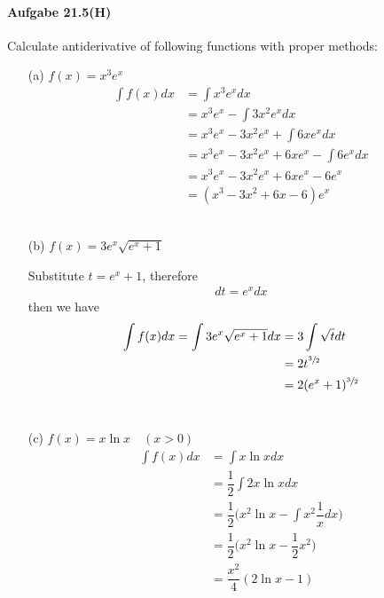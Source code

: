 \documentclass[11pt,a4paper]{article}
\renewcommand{\frac}{\dfrac}
\begin{document}
\newpage

\paragraph{Aufgabe 21.5(H)}

Calculate antiderivative of following functions with proper methods:

\begin{enumerate}

\item[(a)]$f(x)=x^3e^x$
\begin{align}
\int f(x)dx
&=\int x^3e^x dx \\
&=x^3e^x-\int 3x^2e^x dx \\
&=x^3e^x-3x^2e^x+\int 6xe^x dx \\
&=x^3e^x-3x^2e^x+6xe^x-\int 6e^x dx \\
&=x^3e^x-3x^2e^x+6xe^x-6e^x \\
&=(x^3-3x^2+6x-6)e^x
\end{align}\\

\item[(b)]$f(x)=3e^x\sqrt{e^x+1}$

Substitute $t=e^x+1$, therefore
\begin{align}
dt=e^xdx
\end{align}
then we have
\begin{align}
\int f(x)dx=\int 3e^x\sqrt{e^x+1}dx
&=3\int \sqrt{t}dt \\
&=2t^{\sfrac{3}{2}} \\
&=2(e^x+1)^{\sfrac{3}{2}}
\end{align}
\\

\item[(c)]$f(x)=x\ln x \hspace{1em} (x>0)$
\begin{align}
\int f(x)dx
&=\int x\ln x dx \\
&=\frac{1}{2} \int 2x\ln x dx \\
&=\frac{1}{2}\bigg(x^2\ln x-\int x^2\frac{1}{x}dx\bigg) \\
&=\frac{1}{2}\bigg(x^2\ln x-\frac{1}{2}x^2\bigg) \\
&=\frac{x^2}{4}(2\ln x-1)
\end{align}

\newpage


\end{enumerate}
\end{document}
